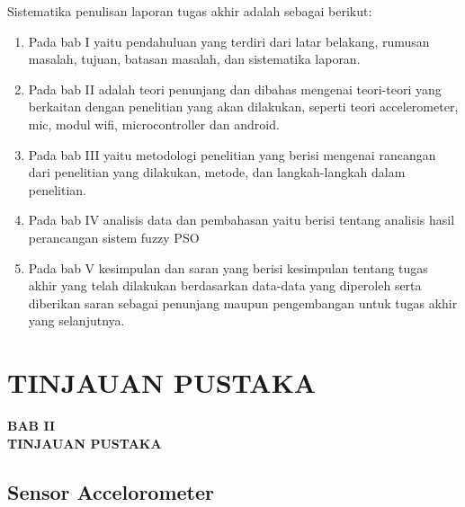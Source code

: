\documentclass[11pt]{article}
\begin{document}
Sistematika penulisan laporan tugas akhir adalah sebagai berikut:

\begin{enumerate}[label=\alph*.]
	
		
	\item Pada bab I yaitu pendahuluan yang terdiri dari latar belakang, rumusan masalah, tujuan, batasan masalah, dan sistematika laporan. 
	\item Pada bab II adalah teori penunjang dan dibahas mengenai teori-teori yang berkaitan dengan penelitian yang akan dilakukan, seperti teori accelerometer, mic, modul wifi, microcontroller dan android.
	\item Pada bab III yaitu metodologi penelitian yang berisi mengenai rancangan dari penelitian yang dilakukan, metode, dan langkah-langkah dalam penelitian. 
	\item Pada bab IV analisis data dan pembahasan yaitu berisi tentang analisis hasil perancangan sistem fuzzy PSO
	\item Pada bab V kesimpulan dan saran yang berisi kesimpulan tentang tugas akhir yang telah dilakukan berdasarkan data-data yang diperoleh serta diberikan saran sebagai penunjang maupun pengembangan untuk tugas akhir yang selanjutnya. 
	
	
\end{enumerate}



\newpage

\setcounter{figure}{0}

\section{TINJAUAN PUSTAKA}

\begin{center}
	{\large \textbf{BAB II}} \\
	{\large \textbf{TINJAUAN PUSTAKA}}
\end{center}

\subsection{Sensor Accelorometer}
\end{document}
